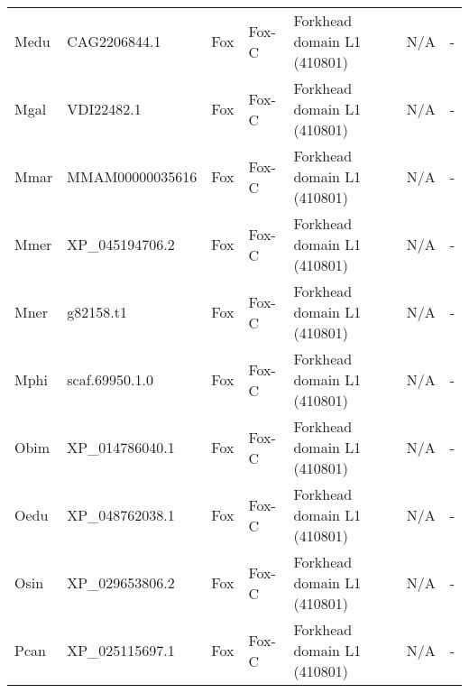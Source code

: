 \documentclass[../main.tex]{subfiles}
\begin{document}
\begin{landscape}
\begin{longtable}{lllllll}
		Medu           & CAG2206844.1          & Fox            & Fox-C               & Forkhead domain L1 (410801)                 & N/A                                                                    & -                    \\
		Mgal           & VDI22482.1            & Fox            & Fox-C               & Forkhead domain L1 (410801)                 & N/A                                                                    & -                    \\
		Mmar           & MMAM00000035616       & Fox            & Fox-C               & Forkhead domain L1 (410801)                 & N/A                                                                    & -                    \\
		Mmer           & XP\_045194706.2       & Fox            & Fox-C               & Forkhead domain L1 (410801)                 & N/A                                                                    & -                    \\
		Mner           & g82158.t1             & Fox            & Fox-C               & Forkhead domain L1 (410801)                 & N/A                                                                    & -                    \\
		Mphi           & scaf.69950.1.0        & Fox            & Fox-C               & Forkhead domain L1 (410801)                 & N/A                                                                    & -                    \\
		Obim           & XP\_014786040.1       & Fox            & Fox-C               & Forkhead domain L1 (410801)                 & N/A                                                                    & -                    \\
		Oedu           & XP\_048762038.1       & Fox            & Fox-C               & Forkhead domain L1 (410801)                 & N/A                                                                    & -                    \\
		Osin           & XP\_029653806.2       & Fox            & Fox-C               & Forkhead domain L1 (410801)                 & N/A                                                                    & -                    \\
		Pcan           & XP\_025115697.1       & Fox            & Fox-C               & Forkhead domain L1 (410801)                 & N/A                                                                    & -                    \\

\end{longtable}
\end{landscape}
\end{document}

